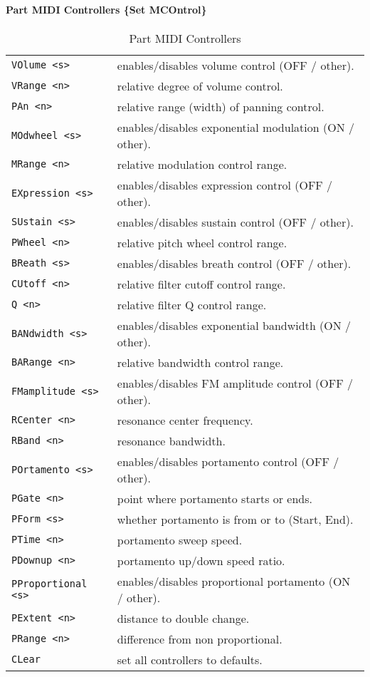 \paragraph{Part MIDI Controllers \scriptsize \{Set MCOntrol\} \normalsize}
\label{paragraph:command_line_part_midi_commands}
   \begin{table}[H]
      \centering
      \caption{Part MIDI Controllers}
      \label{table:yoshimi_part_midi_commands}
      \begin{tabular}{l l}
\texttt{VOlume <s>} &
   enables/disables volume control (OFF / other). \\
\texttt{VRange <n>} &
   relative degree of volume control. \\
\texttt{PAn <n>} &
   relative range (width) of panning control. \\
\texttt{MOdwheel <s>} &
   enables/disables exponential modulation (ON / other). \\
\texttt{MRange <n>} &
   relative modulation control range. \\
\texttt{EXpression <s>} &
   enables/disables expression control (OFF / other). \\
\texttt{SUstain <s>} &
   enables/disables sustain control (OFF / other). \\
\texttt{PWheel <n>} &
   relative pitch wheel control range. \\
\texttt{BReath <s>} &
   enables/disables breath control (OFF / other). \\
\texttt{CUtoff <n>} &
   relative filter cutoff control range. \\
\texttt{Q <n>} &
   relative filter Q control range. \\
\texttt{BANdwidth <s>} &
   enables/disables exponential bandwidth (ON / other). \\
\texttt{BARange <n>} &
   relative bandwidth control range. \\
\texttt{FMamplitude <s>} &
   enables/disables FM amplitude control (OFF / other). \\
\texttt{RCenter <n>} &
   resonance center frequency. \\
\texttt{RBand <n>} &
   resonance bandwidth. \\
\texttt{POrtamento <s>} &
   enables/disables portamento control (OFF / other). \\
\texttt{PGate <n>} &
   point where portamento starts or ends. \\
\texttt{PForm <s>} &
   whether portamento is from or to (Start, End). \\
\texttt{PTime <n>} &
   portamento sweep speed. \\
\texttt{PDownup <n>} &
   portamento up/down speed ratio. \\
\texttt{PProportional <s>} &
   enables/disables proportional portamento (ON / other). \\
\texttt{PExtent <n>} &
   distance to double change. \\
\texttt{PRange <n>} &
   difference from non proportional. \\
\texttt{CLear} &
   set all controllers to defaults. \\
      \end{tabular}
   \end{table}

